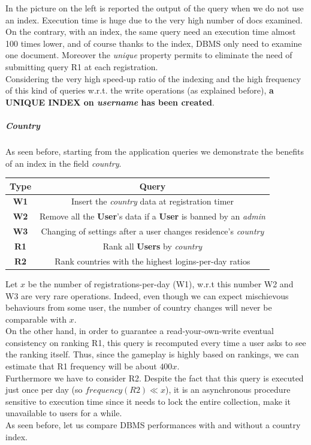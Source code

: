 In the picture on the left is reported the output of the query when we do not use an index. Execution time is huge due to the very high number of docs examined. On the contrary, with an index, the same query need an execution time almost 100 times lower, and of course thanks to the index, DBMS only need to examine one document. Moreover the \textit{unique} property permits to eliminate the need of submitting query R1 at each registration.\\
Considering the very high speed-up ratio of the indexing and the high frequency of this kind of queries w.r.t. the write operations (as explained before), \textbf{a UNIQUE INDEX on \textit{username} has been created}.

\subparagraph{Country}
As seen before, starting from the application queries we demonstrate the benefits of an index in the field \textit{country}.

\begin{center}
	\begin{tabular}{| c | c |} 
		\hline
		\textbf{Type} & \textbf{Query} \\ [0.5ex] 
		\hline
		\textbf{W1} & Insert the \textit{country} data at registration timer \\ 
		\hline
		\textbf{W2} & Remove all the \textbf{User}’s data if a \textbf{User} is banned by an \textit{admin} \\
		\hline
		\textbf{W3} & Changing of settings after a user changes residence’s \textit{country} \\
		\hline
		\textbf{R1} & Rank all \textbf{Users} by \textit{country} \\
		\hline
		\textbf{R2} & Rank countries with the highest logins-per-day ratios \\
		\hline
	\end{tabular}
\end{center}

Let $x$ be the number of registrations-per-day (W1), w.r.t this number W2 and W3 are very rare operations. Indeed, even though we can expect mischievous behaviours from some user, the number of country changes will never be comparable with $x$.\\
On the other hand, in order to guarantee a read-your-own-write eventual consistency on ranking R1, this query is recomputed every time a user asks to see the ranking itself. Thus, since the gameplay is highly based on rankings, we can estimate that R1 frequency will be about $400x$.\\
Furthermore we have to consider R2. Despite the fact that this query is executed just once per day (so $frequency(R2) \ll x$), it is an asynchronous procedure sensitive to execution time since it needs to lock the entire collection, make it unavailable to users for a while.\\
As seen before, let us compare DBMS performances with and without a country index.

